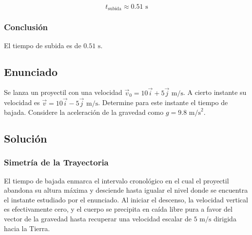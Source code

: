 \documentclass[12pt, a4paper]{article}
\begin{document}
$$t_{\text{subida}} \approx 0.51 \text{ s}$$

\subsubsection*{Conclusión}

El tiempo de subida es de $0.51 \text{ s}$.

\newpage

\subsection*{Enunciado}

Se lanza un proyectil con una velocidad $\vec{v}_0 = 10\vec{i} + 5\vec{j} \text{ m/s}$. A cierto instante su velocidad es $\vec{v} = 10\vec{i} - 5\vec{j} \text{ m/s}$. Determine para este instante el tiempo de bajada. Considere la aceleración de la gravedad como $g = 9.8 \text{ m/s}^2$.

\vspace{0.5cm}

\begin{center}
\end{center}

\subsection*{Solución}

\subsubsection*{Simetría de la Trayectoria}

El tiempo de bajada enmarca el intervalo cronológico en el cual el proyectil abandona su altura máxima y desciende hasta igualar el nivel donde se encuentra el instante estudiado por el enunciado. Al iniciar el descenso, la velocidad vertical es efectivamente cero, y el cuerpo se precipita en caída libre pura a favor del vector de la gravedad hasta recuperar una velocidad escalar de $5 \text{ m/s}$ dirigida hacia la Tierra.
\end{document}
